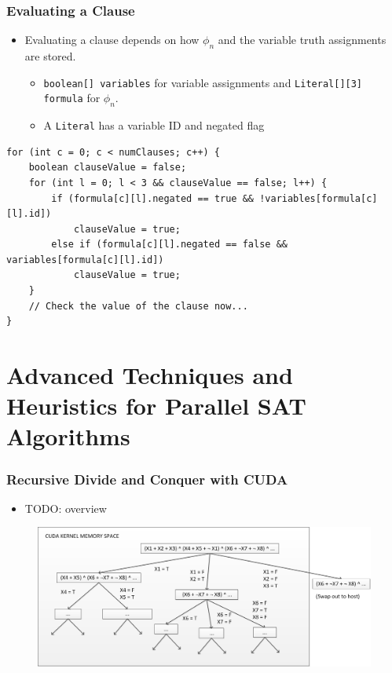 \documentclass[handout]{beamer}
\begin{document}
\begin{frame}[fragile]
	\frametitle{Evaluating a Clause}
\begin{itemize}
	\item Evaluating a clause depends on how $\phi_n$ and the variable truth assignments are stored.
	\begin{itemize}
		\item {\tt boolean[] variables} for variable assignments and {\tt Literal[][3] formula} for $\phi_n$.
		\item A {\tt Literal} has a variable ID and negated flag
	\end{itemize}
\end{itemize}
{\small
\begin{lstlisting}
for (int c = 0; c < numClauses; c++) {
    boolean clauseValue = false;
    for (int l = 0; l < 3 && clauseValue == false; l++) {
        if (formula[c][l].negated == true && !variables[formula[c][l].id])
            clauseValue = true;
        else if (formula[c][l].negated == false && variables[formula[c][l].id])
            clauseValue = true; 
    }
    // Check the value of the clause now...
}
\end{lstlisting}
}
\end{frame}

\section{Advanced Techniques and Heuristics for Parallel SAT Algorithms}
\begin{frame}
	\frametitle{Recursive Divide and Conquer with CUDA}
	\begin{itemize}
		\item TODO: overview
	\end{itemize}
\begin{figure}
\centering
\includegraphics[scale = 0.35]{satDCswap.jpg}
\end{figure}
\end{frame}
\end{document}
